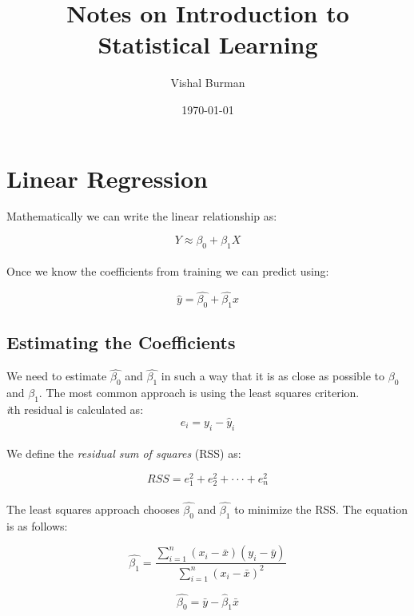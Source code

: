 \documentclass{article}
\title{Notes on Introduction to Statistical Learning}
\author{Vishal Burman}
\date{\today}
\begin{document}
	\maketitle
	\section{Linear Regression}
	
	Mathematically we can write the linear relationship as:
	
	\begin{equation}
		Y \approx \beta_0 + \beta_1X
	\end{equation}\\
	Once we know the coefficients from training we can predict using:

	\begin{equation}
		\hat{y} = \hat{\beta_0} + \hat{\beta_1}x
	\end{equation}

	\subsection{Estimating the Coefficients}
	
	We need to estimate $\hat{\beta_0}$ and $\hat{\beta_1}$ in such a way that it is as close as possible to $\beta_0$ and $\beta_1$. The most common approach is using the least squares criterion.\\
	
	\textit{i}th residual is calculated as:
	\begin{equation}
		e_i =  y_i - \hat{y}_i
	\end{equation}\\
	We define the \textit{residual sum of squares} (RSS) as:
	
	\begin{equation}
		RSS = e_1^2 + e_2^2 + \cdot\cdot\cdot + e_n^2
	\end{equation}\\

	The least squares approach chooses $\hat{\beta_0}$ and $\hat{\beta_1}$ to minimize the RSS. The equation is as follows:
	
	\begin{equation}
		\hat{\beta_1} = \frac{\sum_{i=1}^{n}(x_i - \bar{x})(y_i - \bar{y})}{\sum_{i=1}^{n}(x_i - \bar{x})^2}
	\end{equation}

	\begin{equation}
		\hat{\beta_0} = \bar{y} - \hat{\beta}_1\bar{x}
	\end{equation}
\end{document}
